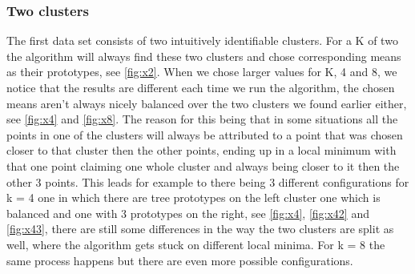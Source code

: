 \documentclass[10pt,a4paper]{article}
\begin{document}
\subsubsection{Two clusters	}
The first data set consists of two intuitively identifiable clusters. For a K of two the algorithm will always find these two clusters and chose corresponding means as their prototypes, see \ref{fig:x2}. 
When we chose larger values for K, 4 and 8, we notice that the results are different each time we run the algorithm, the chosen means aren't always nicely balanced over the two clusters we found earlier either, see \ref{fig:x4} and \ref{fig:x8}. The reason for this being that in some situations all the points in one of the clusters will always be attributed to a point that was chosen  closer to that cluster then the other points, ending up in a local minimum with that one point claiming one whole cluster and always being closer to it then the other 3 points. 
This leads for example to there being 3 different configurations for k = 4 one in which there are tree prototypes on the left cluster one which is balanced and one with 3 prototypes on the right, see \ref{fig:x4}, \ref{fig:x42} and \ref{fig:x43}, there are still some differences in the way the two clusters are split as well, where the algorithm gets stuck on different local minima. For k = 8 the same process happens but there are even more possible configurations.
\end{document}
